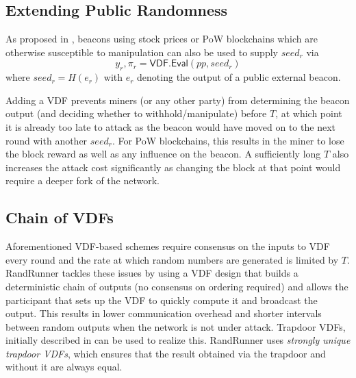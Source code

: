 \documentclass[letterpaper,twocolumn,10pt]{article}
\theoremstyle{definition}
\theoremstyle{remark}
\begin{document}
\subsection{Extending Public Randomness}
As proposed in \cite{bunz2017proofs, bonneau2015bitcoin}, beacons using stock prices \cite{clark2010use} or PoW blockchains \cite{bonneau2015bitcoin} which are otherwise susceptible to manipulation can also be used to supply $seed_r$ via
$$y_r, \pi_r = \mathsf{VDF.Eval}(pp, seed_r)$$
where $seed_r = H(e_r)$ with $e_r$ denoting the output of a public external beacon.

Adding a VDF prevents miners (or any other party) from determining the beacon output (and deciding whether to withhold/manipulate) before $T$, at which point it is already too late to attack as the beacon would have moved on to the next round with another $seed_r$. For PoW blockchains, this results in the miner to lose the block reward as well as any influence on the beacon. A sufficiently long $T$ also increases the attack cost significantly as changing the block at that point would require a deeper fork of the network. 

\subsection{Chain of VDFs}
\label{subsection:randrunner}
Aforementioned VDF-based schemes require consensus on the inputs to VDF every round and the rate at which random numbers are generated is limited by $T$. RandRunner \cite{schindler2021randrunner} tackles these issues by using a VDF design that builds a deterministic chain of outputs (no consensus on ordering required) and allows the participant that sets up the VDF to quickly compute it and broadcast the output. This results in lower communication overhead and shorter intervals between random outputs when the network is not under attack. Trapdoor VDFs, initially described in \cite{wesolowski2019efficient} can be used to realize this. RandRunner uses \emph{strongly unique trapdoor VDFs}, which ensures that the result obtained via the trapdoor and without it are always equal.
\end{document}
